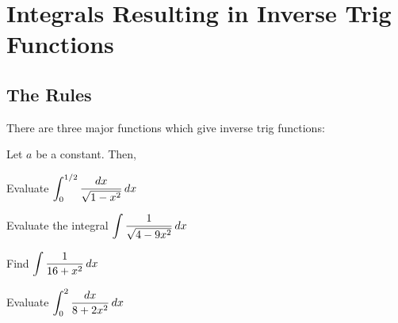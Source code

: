 \documentclass[notes]{subfiles}
\begin{document}
	\fancyhead[LO,RE]{\bfseries \currentname}
	\fancyfoot[C]{{}}
	\fancyfoot[RO,LE]{\large \thepage}	%
	
\section*{Integrals Resulting in Inverse Trig Functions}\label{cs57}
	\subsection*{The Rules}
	
	There are three major functions which give inverse trig functions:
	
	\begin{rmk}
		Let \(a\) be a constant. Then, \\[125pt]
	\end{rmk}
	
	\begin{ex}
		Evaluate \(\displaystyle \int_0^{1/2} \dfrac{dx}{\sqrt{1-x^2}}\, dx\)
	\end{ex}	
		\newpage
		
	\begin{ex}
		Evaluate the integral \(\displaystyle \int \dfrac{1}{\sqrt{4-9x^2}}\, dx\)
	\end{ex}
		
	\begin{ex}
		Find \(\displaystyle \int \dfrac{1}{16 + x^2}\, dx\)
	\end{ex}
		
	\begin{ex}
		Evaluate \(\displaystyle \int_0^2 \dfrac{dx}{8+2x^2}\, dx\)
	\end{ex}
	
	
	\clearpage			
\end{document}

